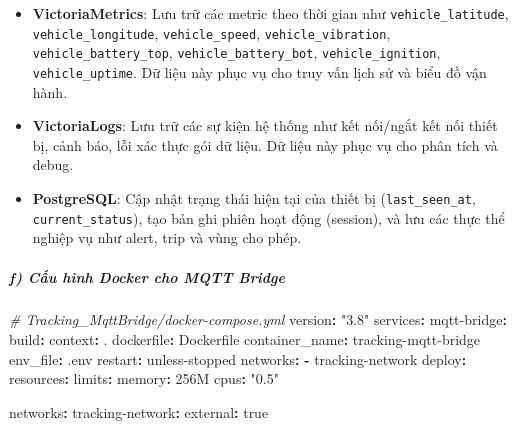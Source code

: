 \documentclass[a4paper]{extarticle}
\newenvironment{Shaded}{}{}
\newcommand{\AttributeTok}[1]{\textcolor[rgb]{0.49,0.56,0.16}{#1}}
\newcommand{\CharTok}[1]{\textcolor[rgb]{0.25,0.44,0.63}{#1}}
\newcommand{\CommentTok}[1]{\textcolor[rgb]{0.38,0.63,0.69}{\textit{#1}}}
\newcommand{\FunctionTok}[1]{\textcolor[rgb]{0.02,0.16,0.49}{#1}}
\newcommand{\KeywordTok}[1]{\textcolor[rgb]{0.00,0.44,0.13}{\textbf{#1}}}
\newcommand{\StringTok}[1]{\textcolor[rgb]{0.25,0.44,0.63}{#1}}
\providecommand{\tightlist}{%
  \setlength{\itemsep}{0pt}\setlength{\parskip}{0pt}}
\begin{document}
\begin{itemize}
\tightlist
\item
  \textbf{VictoriaMetrics}: Lưu trữ các metric theo thời gian như
  \texttt{vehicle\_latitude}, \texttt{vehicle\_longitude},
  \texttt{vehicle\_speed}, \texttt{vehicle\_vibration},
  \texttt{vehicle\_battery\_top}, \texttt{vehicle\_battery\_bot},
  \texttt{vehicle\_ignition}, \texttt{vehicle\_uptime}. Dữ liệu này phục
  vụ cho truy vấn lịch sử và biểu đồ vận hành.
\item
  \textbf{VictoriaLogs}: Lưu trữ các sự kiện hệ thống như kết nối/ngắt
  kết nối thiết bị, cảnh báo, lỗi xác thực gói dữ liệu. Dữ liệu này phục vụ
  cho phân tích và debug.
\item
  \textbf{PostgreSQL}: Cập nhật trạng thái hiện tại của thiết bị
  (\texttt{last\_seen\_at}, \texttt{current\_status}), tạo bản ghi phiên
  hoạt động (session), và lưu các thực thể nghiệp vụ như
  alert, trip và vùng cho phép.
\end{itemize}

\subparagraph{f) Cấu hình Docker cho MQTT
Bridge}\label{f-cux1ea5u-huxecnh-docker-cho-mqtt-bridge}

\begin{Shaded}
\begin{Highlighting}[]
\CommentTok{\# Tracking\_MqttBridge/docker{-}compose.yml}
\FunctionTok{version}\KeywordTok{:}\AttributeTok{ }\StringTok{"3.8"}
\FunctionTok{services}\KeywordTok{:}
\AttributeTok{  }\FunctionTok{mqtt{-}bridge}\KeywordTok{:}
\AttributeTok{    }\FunctionTok{build}\KeywordTok{:}
\AttributeTok{      }\FunctionTok{context}\KeywordTok{:}\AttributeTok{ .}
\AttributeTok{      }\FunctionTok{dockerfile}\KeywordTok{:}\AttributeTok{ Dockerfile}
\AttributeTok{    }\FunctionTok{container\_name}\KeywordTok{:}\AttributeTok{ tracking{-}mqtt{-}bridge}
\AttributeTok{    }\FunctionTok{env\_file}\KeywordTok{:}\AttributeTok{ .env}
\AttributeTok{    }\FunctionTok{restart}\KeywordTok{:}\AttributeTok{ unless{-}stopped}
\AttributeTok{    }\FunctionTok{networks}\KeywordTok{:}
\AttributeTok{      }\KeywordTok{{-}}\AttributeTok{ tracking{-}network}
\AttributeTok{    }\FunctionTok{deploy}\KeywordTok{:}
\AttributeTok{      }\FunctionTok{resources}\KeywordTok{:}
\AttributeTok{        }\FunctionTok{limits}\KeywordTok{:}
\AttributeTok{          }\FunctionTok{memory}\KeywordTok{:}\AttributeTok{ 256M}
\AttributeTok{          }\FunctionTok{cpus}\KeywordTok{:}\AttributeTok{ }\StringTok{"0.5"}

\FunctionTok{networks}\KeywordTok{:}
\AttributeTok{  }\FunctionTok{tracking{-}network}\KeywordTok{:}
\AttributeTok{    }\FunctionTok{external}\KeywordTok{:}\AttributeTok{ }\CharTok{true}
\end{Highlighting}
\end{Shaded}
\end{document}
